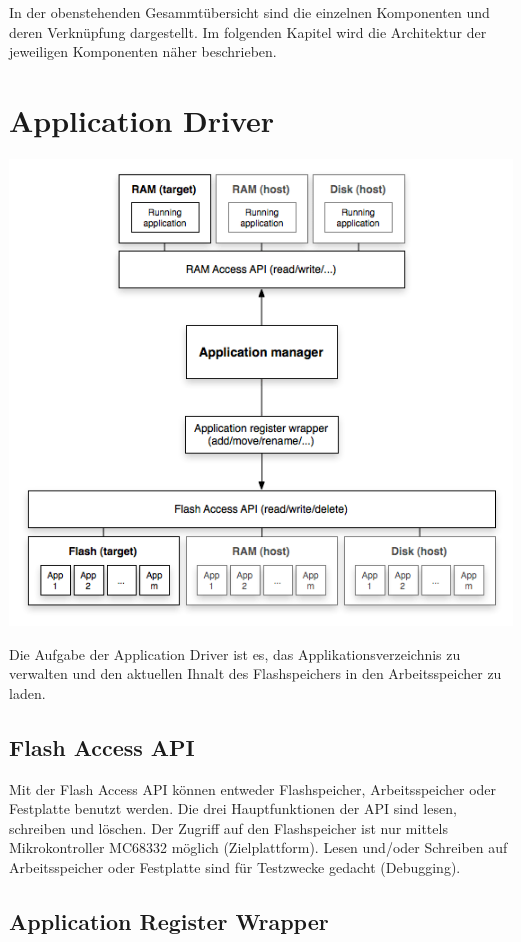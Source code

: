 \documentclass[letterpaper,10pt,ngerman]{manual}
\begin{document}
In der obenstehenden Gesammtübersicht sind die einzelnen Komponenten und deren Verknüpfung dargestellt.
Im folgenden Kapitel wird die Architektur der jeweiligen Komponenten näher
beschrieben.


\section{Application Driver}

\includegraphics{app-manager.png}

Die Aufgabe der Application Driver ist es, das Applikationsverzeichnis zu
verwalten und den aktuellen Ihnalt des Flashspeichers in den Arbeitsspeicher zu laden.


\subsection{Flash Access API}

Mit der Flash Access API können entweder Flashspeicher, Arbeitsspeicher oder
Festplatte benutzt werden. Die drei Hauptfunktionen der API sind lesen,
schreiben und löschen.
Der Zugriff auf den Flashspeicher ist nur mittels Mikrokontroller MC68332 möglich (Zielplattform).
Lesen und/oder Schreiben auf Arbeitsspeicher oder Festplatte sind für Testzwecke gedacht (Debugging).


\subsection{Application Register Wrapper}
\end{document}
